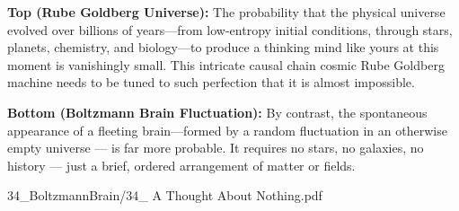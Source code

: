\begin{SideNotePage}{
  \textbf{Top (Rube Goldberg Universe):}  
  The probability that the physical universe evolved over billions of years—from low-entropy initial conditions, through stars, planets, chemistry, and biology—to produce a thinking mind like yours at this moment is vanishingly small. This intricate causal chain cosmic Rube Goldberg machine needs to be tuned to such perfection that it is almost impossible. \par

  \textbf{Bottom (Boltzmann Brain Fluctuation):}  
  By contrast, the spontaneous appearance of a fleeting brain—formed by a random fluctuation in an otherwise empty universe — is far more probable. It requires no stars, no galaxies, no history — just a brief, ordered arrangement of matter or fields.\par
}{34_BoltzmannBrain/34_ A Thought About Nothing.pdf}
\end{SideNotePage}
